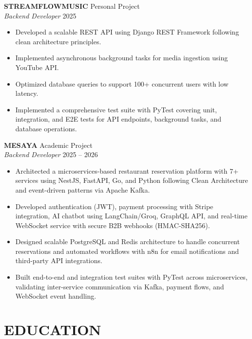 \documentclass[11pt, a4paper]{article}
\begin{document}
\vspace{4pt}

\textbf{STREAMFLOWMUSIC} \hfill Personal Project \\
\textit{Backend Developer} \hfill 2025

\begin{itemize}
\item Developed a scalable REST API using Django REST Framework following clean architecture principles.
\item Implemented asynchronous background tasks for media ingestion using YouTube API.
\item Optimized database queries to support 100+ concurrent users with low latency.
\item Implemented a comprehensive test suite with PyTest covering unit, integration, and E2E tests for API endpoints, background tasks, and database operations.
\end{itemize}

\vspace{4pt}

\textbf{MESAYA} \hfill Academic Project \\
\textit{Backend Developer} \hfill 2025 -- 2026

\begin{itemize}
\item Architected a microservices-based restaurant reservation platform with 7+ services using NestJS, FastAPI, Go, and Python following Clean Architecture and event-driven patterns via Apache Kafka.
\item Developed authentication (JWT), payment processing with Stripe integration, AI chatbot using LangChain/Groq, GraphQL API, and real-time WebSocket service with secure B2B webhooks (HMAC-SHA256).
\item Designed scalable PostgreSQL and Redis architecture to handle concurrent reservations and automated workflows with n8n for email notifications and third-party API integrations.
\item Built end-to-end and integration test suites with PyTest across microservices, validating inter-service communication via Kafka, payment flows, and WebSocket event handling.
\end{itemize}

\section*{EDUCATION}
\end{document}
